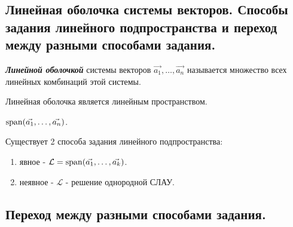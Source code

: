 \subsection{
    Линейная оболочка системы векторов. Способы задания линейного подпространства и переход между разными способами задания.
}

\begin{definition}
    \textbf{\textit{Линейной оболочкой}} системы векторов $\vec{a_1}, \ldots, \vec{a_n}$ называется множество всех линейных комбинаций этой системы.
\end{definition}

\begin{theorem}
    Линейная оболочка является линейным пространством.
\end{theorem}

\begin{designation}
    $\operatorname{\mathop{\mathrm{span}}}(\vec{a_1}, \ldots, \vec{a_n})$.
\end{designation}

Существует 2 способа задания линейного подпространства:

\begin{enumerate}
    \item явное - $\mathcal{L} = \operatorname{\mathop{\mathrm{span}}}(\vec{a_1}, \ldots, \vec{a_k})$.
    \item неявное - $\mathcal{L}$ - решение однородной СЛАУ.
\end{enumerate}

\subsection*{Переход между разными способами задания.
}

